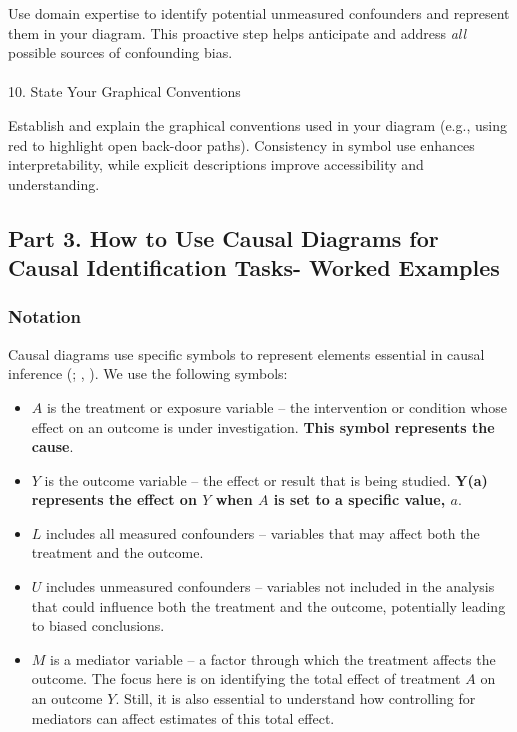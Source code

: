 \documentclass[
  singlecolumn]{article}
\makeatletter
\let\oldparagraph\paragraph
\renewcommand{\paragraph}{
    \@ifstar
      \xxxParagraphStar
      \xxxParagraphNoStar
  }
\newcommand{\xxxParagraphStar}[1]{\oldparagraph*{#1}\mbox{}}
\newcommand{\xxxParagraphNoStar}[1]{\oldparagraph{#1}\mbox{}}
\providecommand{\tightlist}{%
  \setlength{\itemsep}{0pt}\setlength{\parskip}{0pt}}\usepackage{longtable,booktabs,array}
\makeatother
\begin{document}
Use domain expertise to identify potential unmeasured confounders and
represent them in your diagram. This proactive step helps anticipate and
address \emph{all} possible sources of confounding bias.

\paragraph{10. State Your Graphical
Conventions}\label{state-your-graphical-conventions}

Establish and explain the graphical conventions used in your diagram
(e.g., using red to highlight open back-door paths). Consistency in
symbol use enhances interpretability, while explicit descriptions
improve accessibility and understanding.

\subsection{Part 3. How to Use Causal Diagrams for Causal Identification
Tasks- Worked Examples}\label{section-part3}

\subsubsection{Notation}\label{notation}

Causal diagrams use specific symbols to represent elements essential in
causal inference (; ,
). We use the following symbols:

\begin{itemize}
\tightlist
\item
  \textbf{\(A\)} is the treatment or exposure variable -- the
  intervention or condition whose effect on an outcome is under
  investigation. \textbf{This symbol represents the cause}.
\item
  \textbf{\(Y\)} is the outcome variable -- the effect or result that is
  being studied. \textbf{Y(a) represents the effect on \(Y\) when \(A\)
  is set to a specific value, \(a\)}.
\item
  \textbf{\(L\)} includes all measured confounders -- variables that may
  affect both the treatment and the outcome.
\item
  \textbf{\(U\)} includes unmeasured confounders -- variables not
  included in the analysis that could influence both the treatment and
  the outcome, potentially leading to biased conclusions.
\item
  \textbf{\(M\)} is a mediator variable -- a factor through which the
  treatment affects the outcome. The focus here is on identifying the
  total effect of treatment \(A\) on an outcome \(Y\). Still, it is also
  essential to understand how controlling for mediators can affect
  estimates of this total effect.
\end{itemize}
\end{document}
